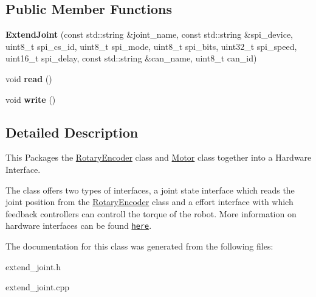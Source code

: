 \subsection*{Public Member Functions}
\begin{DoxyCompactItemize}
\item 
\mbox{\label{classExtendJoint_a115a7b5763d4496e9c365614241b2351}} 
{\bfseries Extend\+Joint} (const std\+::string \&joint\+\_\+name, const std\+::string \&spi\+\_\+device, uint8\+\_\+t spi\+\_\+cs\+\_\+id, uint8\+\_\+t spi\+\_\+mode, uint8\+\_\+t spi\+\_\+bits, uint32\+\_\+t spi\+\_\+speed, uint16\+\_\+t spi\+\_\+delay, const std\+::string \&can\+\_\+name, uint8\+\_\+t can\+\_\+id)
\item 
\mbox{\label{classExtendJoint_a703426ab8a4047bb7a6087ffff734b5d}} 
void {\bfseries read} ()
\item 
\mbox{\label{classExtendJoint_aaaddc50f230254a001ce8b3f56064371}} 
void {\bfseries write} ()
\end{DoxyCompactItemize}


\subsection{Detailed Description}
This Packages the \hyperlink{classRotaryEncoder}{Rotary\+Encoder} class and \hyperlink{classMotor}{Motor} class together into a Hardware Interface. 

The class offers two types of interfaces, a joint state interface which reads the joint position from the \hyperlink{classRotaryEncoder}{Rotary\+Encoder} class and a effort interface with which feedback controllers can controll the torque of the robot. More information on hardware interfaces can be found \href{http://wiki.ros.org/ros_control#Hardware_Interfaces}{\tt here}. 

The documentation for this class was generated from the following files\+:\begin{DoxyCompactItemize}
\item 
extend\+\_\+joint.\+h\item 
extend\+\_\+joint.\+cpp\end{DoxyCompactItemize}
